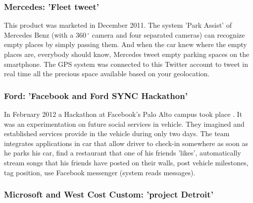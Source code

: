 \documentclass[a4paper]{article}
\begin{document}
\subsubsection{Mercedes: 'Fleet tweet'}

This product \cite{Tweet} was marketed in December 2011. The system 'Park Assist' of Mercedes Benz (with a $360\,^{\circ}$ camera and four separated cameras) can recognize empty places by simply passing them. And when the car knew where the empty places are, everybody should know, Mercedes tweet empty parking spaces on the smartphone. The GPS system was connected to this Twitter account to tweet in real time all the precious space available based on your geolocation. 

\subsubsection{Ford: 'Facebook and Ford SYNC Hackathon'}

In February 2012 a Hackathon at Facebook's Palo Alto campus took place \cite{Facebook}. It was an experimentation on future social services in vehicle. They imagined and established services provide in the vehicle during only two days. The team integrates applications in car that allow driver to check-in somewhere as soon as he parks his car, find a restaurant that one of his friends 'likes', automatically stream songs that his friends have posted on their walls, post vehicle milestones, tag position, use Facebook messenger (system reads messages).

\subsubsection{Microsoft and West Cost Custom: 'project Detroit'}
\end{document}
